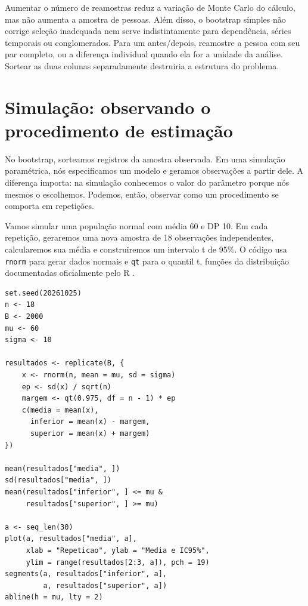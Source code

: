 Aumentar o número de reamostras reduz a variação de Monte Carlo do cálculo, mas não aumenta a amostra de pessoas. Além disso, o bootstrap simples não corrige seleção inadequada nem serve indistintamente para dependência, séries temporais ou conglomerados. Para um antes/depois, reamostre a pessoa com seu par completo, ou a diferença individual quando ela for a unidade da análise. Sortear as duas colunas separadamente destruiria a estrutura do problema.

\section{Simulação: observando o procedimento de estimação}
\label{sec:simulacao-cobertura}

No bootstrap, sorteamos registros da amostra observada. Em uma simulação paramétrica, nós especificamos um modelo e geramos observações a partir dele. A diferença importa: na simulação conhecemos o valor do parâmetro porque nós mesmos o escolhemos. Podemos, então, observar como um procedimento se comporta em repetições.

Vamos simular uma população normal com média 60 e DP 10. Em cada repetição, geraremos uma nova amostra de 18 observações independentes, calcularemos sua média e construiremos um intervalo t de 95\%. O código usa \texttt{rnorm} para gerar dados normais e \texttt{qt} para o quantil t, funções da distribuição documentadas oficialmente pelo R \parencite{RNormal,RTStudent}.

\begin{verbatim}
set.seed(20261025)
n <- 18
B <- 2000
mu <- 60
sigma <- 10

resultados <- replicate(B, {
    x <- rnorm(n, mean = mu, sd = sigma)
    ep <- sd(x) / sqrt(n)
    margem <- qt(0.975, df = n - 1) * ep
    c(media = mean(x),
      inferior = mean(x) - margem,
      superior = mean(x) + margem)
})

mean(resultados["media", ])
sd(resultados["media", ])
mean(resultados["inferior", ] <= mu &
     resultados["superior", ] >= mu)

a <- seq_len(30)
plot(a, resultados["media", a],
     xlab = "Repeticao", ylab = "Media e IC95%",
     ylim = range(resultados[2:3, a]), pch = 19)
segments(a, resultados["inferior", a],
         a, resultados["superior", a])
abline(h = mu, lty = 2)
\end{verbatim}

